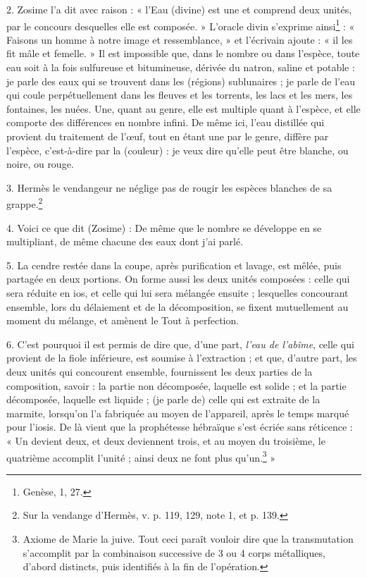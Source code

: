 \documentclass[a4paper, 11pt, oneside, polutonikogreek, french]{article}
\begin{document}
2. Zosime l'a dit avec raison : « l'Eau (divine) est une et comprend deux unités, par le concours desquelles elle est composée. » L'oracle divin s'exprime ainsi\footnote{Genèse, 1, 27.} : « Faisons un homme à notre image et ressemblance, » et l'écrivain ajoute : « il les fit mâle et femelle. » Il est impossible que, dans le nombre ou dans l'espèce, toute eau soit à la fois sulfureuse et bitumineuse, dérivée du natron, saline et potable : je parle des eaux qui se trouvent dans les (régions) sublunaires ; je parle de l'eau qui coule perpétuellement dans les fleuves et les torrents, les lacs et les mers, les fontaines, les nuées. Une, quant au genre, elle est multiple quant à l'espèce, et elle comporte des différences en nombre infini. De même ici, l'eau distillée qui provient du traitement de l'œuf, tout en étant une par le genre, diffère par l'espèce, c'est-à-dire par la (couleur) : je veux dire qu'elle peut être blanche, ou noire, ou rouge.

3. Hermès le vendangeur ne néglige pas de rougir les espèces blanches de sa grappe.\footnote{Sur la vendange d'Hermès, v. p. 119, 129, note 1, et p. 139.}

4. Voici ce que dit (Zosime) : De même que le nombre se développe en se multipliant, de même chacune des eaux dont j'ai parlé.

5. La cendre restée dans la coupe, après purification et lavage, est mêlée, puis partagée en deux portions. On forme aussi les deux unités composées : celle qui sera réduite en ios, et celle qui lui sera mélangée ensuite ; lesquelles concourant ensemble, lors du délaiement et de la décomposition, se fixent mutuellement au moment du mélange, et amènent le Tout à perfection.

6. C'est pourquoi il est permis de dire que, d'une part, \emph{l'eau de l'abîme}, celle qui provient de la fiole inférieure, est soumise à l'extraction ; et que, d'autre part, les deux unités qui concourent ensemble, fournissent les deux parties de la composition, savoir : la partie non décomposée, laquelle est solide ; et la partie décomposée, laquelle est liquide ; (je parle de) celle qui est extraite de la marmite, lorsqu'on l'a fabriquée au moyen de l'appareil, après le temps marqué pour l'iosis. De là vient que la prophétesse hébraïque s'est écriée sans réticence : « Un devient deux, et deux deviennent trois, et au moyen du troisième, le quatrième accomplit l'unité ; ainsi deux ne font plus qu'un.\footnote{Axiome de Marie la juive. Tout ceci paraît vouloir dire que la transmutation s'accomplit par la combinaison successive de 3 ou 4 corps métalliques, d'abord distincts, puis identifiés à la fin de l'opération.} »
\end{document}
